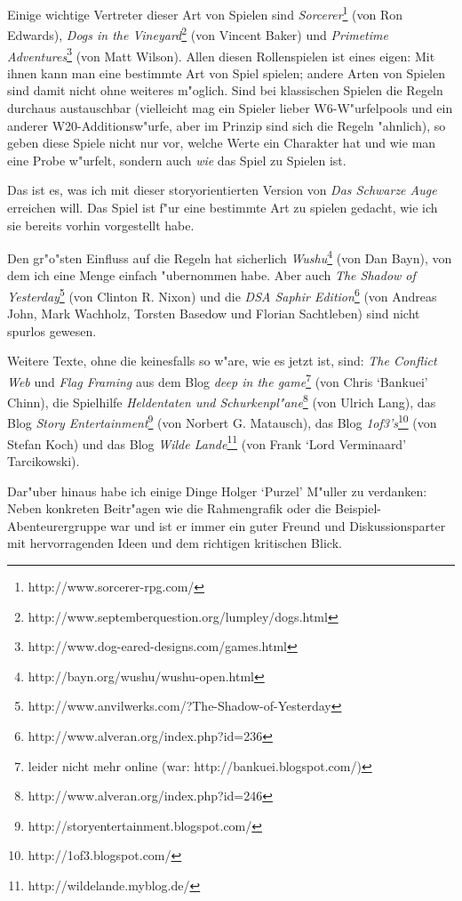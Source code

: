 Einige wichtige Vertreter dieser Art von Spielen sind \emph{Sorcerer}\footnote{{http://www.sorcerer-rpg.com/}} (von Ron Edwards), \emph{Dogs in the Vineyard}\footnote{{http://www.septemberquestion.org/lumpley/dogs.html}} (von Vincent Baker) und \emph{Primetime Adventures}\footnote{{http://www.dog-eared-designs.com/games.html}} (von Matt Wilson). Allen diesen Rollenspielen ist eines eigen: Mit ihnen kann man eine bestimmte Art von Spiel spielen; andere Arten von Spielen sind damit nicht ohne weiteres m"oglich. Sind bei klassischen Spielen die Regeln durchaus austauschbar (vielleicht mag ein Spieler lieber W6-W"urfelpools und ein anderer W20-Additionsw"urfe, aber im Prinzip sind sich die Regeln "ahnlich), so geben diese Spiele nicht nur vor, welche Werte ein Charakter hat und wie man eine Probe w"urfelt, sondern auch \emph{wie} das Spiel zu Spielen ist.

Das ist es, was ich mit dieser storyorientierten Version von \emph{Das Schwarze Auge} erreichen will. Das Spiel ist f"ur eine bestimmte Art zu spielen gedacht, wie ich sie bereits vorhin vorgestellt habe.

Den gr"o"sten Einfluss auf die Regeln hat sicherlich \emph{Wushu}\footnote{{http://bayn.org/wushu/wushu-open.html}} (von Dan Bayn), von dem ich eine Menge einfach "ubernommen habe. Aber auch \emph{The Shadow of Yesterday}\footnote{{http://www.anvilwerks.com/?The-Shadow-of-Yesterday}} (von Clinton R. Nixon) und die \emph{DSA Saphir Edition}\footnote{http://www.alveran.org/index.php?id=236} (von Andreas John, Mark Wachholz, Torsten Basedow und Florian Sachtleben) sind nicht spurlos gewesen.

Weitere Texte, ohne die \StoryDSA keinesfalls so w"are, wie es jetzt ist, sind: \emph{The Conflict Web} und \emph{Flag Framing} aus dem Blog \emph{deep in the game}\footnote{leider nicht mehr online (war: http://bankuei.blogspot.com/)} (von Chris `Bankuei' Chinn), die Spielhilfe \emph{Heldentaten und Schurkenpl"ane}\footnote{http://www.alveran.org/index.php?id=246} (von Ulrich Lang), das Blog \emph{Story Entertainment}\footnote{http://storyentertainment.blogspot.com/} (von Norbert G. Matausch), das Blog \emph{1of3's}\footnote{http://1of3.blogspot.com/} (von Stefan Koch) und das Blog \emph{Wilde Lande}\footnote{http://wildelande.myblog.de/} (von Frank `Lord Verminaard' Tarcikowski).

Dar"uber hinaus habe ich einige Dinge Holger `Purzel' M"uller zu verdanken: Neben konkreten Beitr"agen wie die Rahmengrafik oder die Beispiel-Abenteurergruppe war und ist er immer ein guter Freund und Diskussionsparter mit hervorragenden Ideen und dem richtigen kritischen Blick. 

